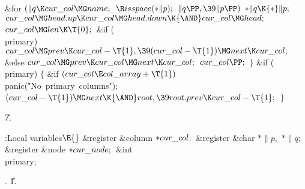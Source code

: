 \&{for} ${}(\|q\K\\{cur\_col}\MG\\{name};{}$ ${}\R\\{isspace}({*}\|p);{}$ ${}%
\|q\PP,\39\|p\PP){}$\1\5
${}{*}\|q\K{*}\|p;{}$\2\6
${}\\{cur\_col}\MG\\{head}.\\{up}\K\\{cur\_col}\MG\\{head}.\\{down}\K{\AND}%
\\{cur\_col}\MG\\{head};{}$\6
${}\\{cur\_col}\MG\\{len}\K\T{0};{}$\6
\&{if} (\\{primary})\1\5
${}\\{cur\_col}\MG\\{prev}\K\\{cur\_col}-\T{1},\39(\\{cur\_col}-\T{1})\MG%
\\{next}\K\\{cur\_col};{}$\2\6
\&{else}\1\5
${}\\{cur\_col}\MG\\{prev}\K\\{cur\_col}\MG\\{next}\K\\{cur\_col};{}$\2\6
${}\\{cur\_col}\PP;{}$\6
\4${}\}{}$\2\6
\&{if} (\\{primary})\5
${}\{{}$\1\6
\&{if} ${}(\\{cur\_col}\E\\{col\_array}+\T{1}){}$\1\5
\\{panic}(\.{"No\ primary\ columns"});\2\6
${}(\\{cur\_col}-\T{1})\MG\\{next}\K{\AND}\\{root},\39\\{root}.\\{prev}\K\\{cur%
\_col}-\T{1};{}$\6
\4${}\}{}$\2\par
\U7.\fi

\B{}:Local variables\X${}\E{}$\6
\&{register} \&{column} ${}{*}\\{cur\_col};{}$\6
\&{register} \&{char} ${}{*}\|p,{}$ ${}{*}\|q;{}$\6
\&{register} \&{node} ${}{*}\\{cur\_node};{}$\6
\&{int} \\{primary};\par
{}.
\U1.\fi

